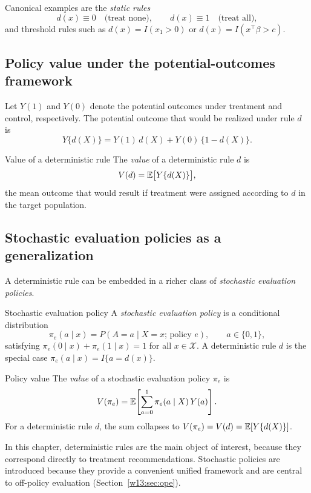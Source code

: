 \documentclass[master.tex]{subfiles}
\begin{document}
Canonical examples are the \emph{static rules}
\[
d(x)\equiv 0 \quad\text{(treat none)},
\qquad
d(x)\equiv 1 \quad\text{(treat all)},
\]
and threshold rules such as $d(x)=I(x_1>0)$ or $d(x)=I(x^\top\beta>c)$.

\subsection{Policy value under the potential-outcomes framework}
\label{w13:subsec:value-po}

Let $Y(1)$ and $Y(0)$ denote the potential outcomes under treatment and control, respectively.  The potential outcome that would be realized under rule $d$ is
\[
Y\{d(X)\} = Y(1)\,d(X) + Y(0)\,\{1-d(X)\}.
\]

\begin{defn}{Value of a deterministic rule}
\label{w13:defn:value-det}
The \emph{value} of a deterministic rule $d$ is
\[
V(d) = \mathbb{E}\bigl[Y\{d(X)\}\bigr],
\]
the mean outcome that would result if treatment were assigned according to $d$ in the target population.
\end{defn}

\subsection{Stochastic evaluation policies as a generalization}
\label{w13:subsec:stochastic}

A deterministic rule can be embedded in a richer class of \emph{stochastic evaluation policies}.

\begin{defn}{Stochastic evaluation policy}
\label{w13:defn:eval-policy}
A \emph{stochastic evaluation policy} is a conditional distribution
\[
\pi_e(a\mid x) = P(A=a\mid X=x;\,\text{policy }e), \qquad a\in\{0,1\},
\]
satisfying $\pi_e(0\mid x)+\pi_e(1\mid x)=1$ for all $x\in\mathcal X$.  A deterministic rule $d$ is the special case $\pi_e(a\mid x)=I\{a=d(x)\}$.
\end{defn}

\begin{defn}{Policy value}
\label{w13:defn:value}
The \emph{value} of a stochastic evaluation policy $\pi_e$ is
\[
V(\pi_e)
=
\mathbb{E}\!\left[\sum_{a=0}^1\pi_e(a\mid X)\,Y(a)\right].
\]
For a deterministic rule $d$, the sum collapses to $V(\pi_e)=V(d)=\mathbb{E}[Y\{d(X)\}]$.
\end{defn}

In this chapter, deterministic rules are the main object of interest, because they correspond directly to treatment recommendations.  Stochastic policies are introduced because they provide a convenient unified framework and are central to off-policy evaluation (Section~\ref{w13:sec:ope}).
\end{document}
